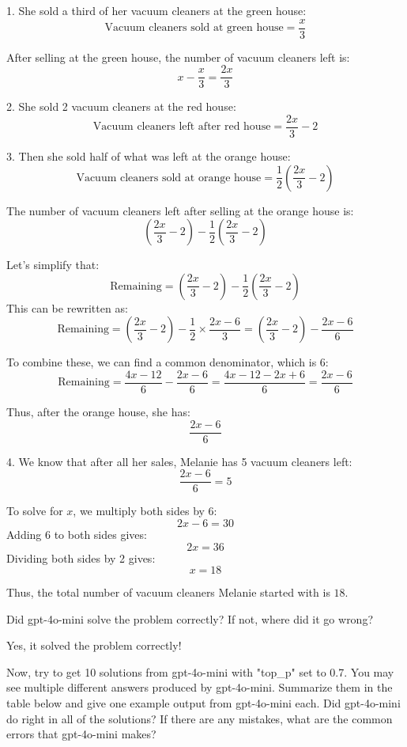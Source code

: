 \documentclass[11pt,addpoints,answers]{exam}
\begin{document}
\begin{questions}
\begin{tcolorbox}[fit,height=16.5cm, width=16cm, blank, borderline={1pt}{-2pt},nobeforeafter]
1. She sold a third of her vacuum cleaners at the green house:
   \[
   \text{Vacuum cleaners sold at green house} = \frac{x}{3}
   \]
   
   After selling at the green house, the number of vacuum cleaners left is:
   \[
   x - \frac{x}{3} = \frac{2x}{3}
   \]

2. She sold 2 vacuum cleaners at the red house:
   \[
   \text{Vacuum cleaners left after red house} = \frac{2x}{3} - 2
   \]

3. Then she sold half of what was left at the orange house:
   \[
   \text{Vacuum cleaners sold at orange house} = \frac{1}{2} \left(\frac{2x}{3} - 2\right)
   \]

   The number of vacuum cleaners left after selling at the orange house is:
   \[
   \left(\frac{2x}{3} - 2\right) - \frac{1}{2} \left(\frac{2x}{3} - 2\right)
   \]

   Let's simplify that:
   \[
   \text{Remaining} = \left(\frac{2x}{3} - 2\right) - \frac{1}{2} \left(\frac{2x}{3} - 2\right)
   \]
   This can be rewritten as:
   \[
   \text{Remaining} = \left(\frac{2x}{3} - 2\right) - \frac{1}{2} \times \frac{2x - 6}{3} = \left(\frac{2x}{3} - 2\right) - \frac{2x - 6}{6}
   \]

   To combine these, we can find a common denominator, which is 6:
   \[
   \text{Remaining} = \frac{4x - 12}{6} - \frac{2x - 6}{6} = \frac{4x - 12 - 2x + 6}{6} = \frac{2x - 6}{6}
   \]

   Thus, after the orange house, she has:
   \[
   \frac{2x - 6}{6}
   \]

4. We know that after all her sales, Melanie has 5 vacuum cleaners left:
   \[
   \frac{2x - 6}{6} = 5
   \]

   To solve for \( x \), we multiply both sides by 6:
   \[
   2x - 6 = 30
   \]
   Adding 6 to both sides gives:
   \[
   2x = 36
   \]
   Dividing both sides by 2 gives:
   \[
   x = 18
   \]

Thus, the total number of vacuum cleaners Melanie started with is \( \boxed{18} \).
    \end{tcolorbox}

    Did gpt-4o-mini solve the problem correctly?  If not, where did it go wrong?

    \begin{tcolorbox}[fit,height=2cm, width=16cm, blank, borderline={1pt}{-2pt},nobeforeafter]
    Yes, it solved the problem correctly!
    \end{tcolorbox}

    \question[10] Now, try to get 10 solutions from gpt-4o-mini with "top\_p" set to 0.7. 
    You may see multiple different answers produced by gpt-4o-mini. Summarize them in the table below and give one example output from gpt-4o-mini each. Did gpt-4o-mini do right in all of the solutions? If there are any mistakes, what are the common errors that gpt-4o-mini makes?


\end{questions}
\end{document}
